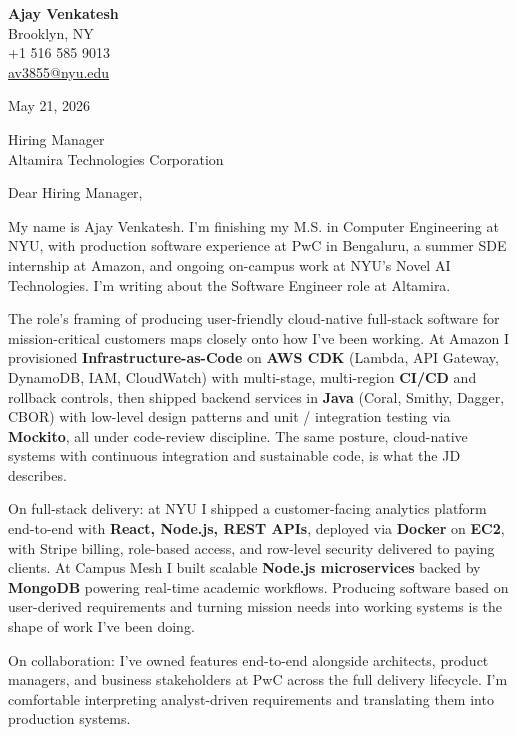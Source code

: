 \documentclass[letterpaper,11pt]{article}
\begin{document}
\begin{flushleft}
\textbf{\large Ajay Venkatesh} \\
Brooklyn, NY \\
+1 516 585 9013 \\
\href{mailto:av3855@nyu.edu}{av3855@nyu.edu}
\end{flushleft}
\vspace{10pt}
May 21, 2026
\vspace{6pt}

Hiring Manager \\
Altamira Technologies Corporation

\vspace{10pt}

Dear Hiring Manager,

My name is Ajay Venkatesh. I'm finishing my M.S. in Computer Engineering at NYU, with production software experience at PwC in Bengaluru, a summer SDE internship at Amazon, and ongoing on-campus work at NYU's Novel AI Technologies. I'm writing about the Software Engineer role at Altamira.

The role's framing of producing user-friendly cloud-native full-stack software for mission-critical customers maps closely onto how I've been working. At Amazon I provisioned \textbf{Infrastructure-as-Code} on \textbf{AWS CDK} (Lambda, API Gateway, DynamoDB, IAM, CloudWatch) with multi-stage, multi-region \textbf{CI/CD} and rollback controls, then shipped backend services in \textbf{Java} (Coral, Smithy, Dagger, CBOR) with low-level design patterns and unit / integration testing via \textbf{Mockito}, all under code-review discipline. The same posture, cloud-native systems with continuous integration and sustainable code, is what the JD describes.

On full-stack delivery: at NYU I shipped a customer-facing analytics platform end-to-end with \textbf{React, Node.js, REST APIs}, deployed via \textbf{Docker} on \textbf{EC2}, with Stripe billing, role-based access, and row-level security delivered to paying clients. At Campus Mesh I built scalable \textbf{Node.js microservices} backed by \textbf{MongoDB} powering real-time academic workflows. Producing software based on user-derived requirements and turning mission needs into working systems is the shape of work I've been doing.

On collaboration: I've owned features end-to-end alongside architects, product managers, and business stakeholders at PwC across the full delivery lifecycle. I'm comfortable interpreting analyst-driven requirements and translating them into production systems.
\end{document}

